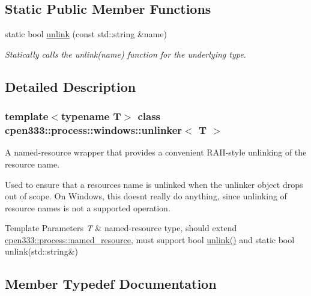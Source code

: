 \subsection*{Static Public Member Functions}
\begin{DoxyCompactItemize}
\item 
static bool \hyperlink{classcpen333_1_1process_1_1windows_1_1unlinker_a178646833bce209b221bd3262ab012bb}{unlink} (const std\+::string \&name)
\begin{DoxyCompactList}\small\item\em Statically calls the {\ttfamily unlink(name)} function for the underlying type. \end{DoxyCompactList}\end{DoxyCompactItemize}


\subsection{Detailed Description}
\subsubsection*{template$<$typename T$>$\newline
class cpen333\+::process\+::windows\+::unlinker$<$ T $>$}

A named-\/resource wrapper that provides a convenient R\+A\+I\+I-\/style unlinking of the resource name. 

Used to ensure that a resource\textquotesingle{}s name is unlinked when the unlinker object drops out of scope. On Windows, this doesn\textquotesingle{}t really do anything, since unlinking of resource names is not a supported operation.


\begin{DoxyTemplParams}{Template Parameters}
{\em T} & named-\/resource type, should extend \hyperlink{classcpen333_1_1process_1_1named__resource}{cpen333\+::process\+::named\+\_\+resource}, must support {\ttfamily bool \hyperlink{classcpen333_1_1process_1_1windows_1_1unlinker_a178646833bce209b221bd3262ab012bb}{unlink()}} and {\ttfamily static bool unlink(std\+::string\&)} \\
\hline
\end{DoxyTemplParams}


\subsection{Member Typedef Documentation}
\mbox{\label{classcpen333_1_1process_1_1windows_1_1unlinker_a8fc5b25e2201aa44cf2323b46a98654b}} 
